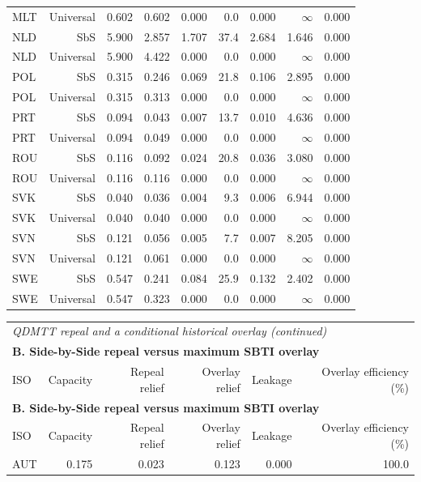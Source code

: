 {\begin{longtable}{@{}lrrrrrrrr@{}}
MLT & Universal & 0.602 & 0.602 & 0.000 &  0.0 & 0.000 & $\infty$ & 0.000 \\
NLD & SbS & 5.900 & 2.857 & 1.707 & 37.4 & 2.684 & 1.646 & 0.000 \\
NLD & Universal & 5.900 & 4.422 & 0.000 &  0.0 & 0.000 & $\infty$ & 0.000 \\
POL & SbS & 0.315 & 0.246 & 0.069 & 21.8 & 0.106 & 2.895 & 0.000 \\
POL & Universal & 0.315 & 0.313 & 0.000 &  0.0 & 0.000 & $\infty$ & 0.000 \\
PRT & SbS & 0.094 & 0.043 & 0.007 & 13.7 & 0.010 & 4.636 & 0.000 \\
PRT & Universal & 0.094 & 0.049 & 0.000 &  0.0 & 0.000 & $\infty$ & 0.000 \\
ROU & SbS & 0.116 & 0.092 & 0.024 & 20.8 & 0.036 & 3.080 & 0.000 \\
ROU & Universal & 0.116 & 0.116 & 0.000 &  0.0 & 0.000 & $\infty$ & 0.000 \\
SVK & SbS & 0.040 & 0.036 & 0.004 &  9.3 & 0.006 & 6.944 & 0.000 \\
SVK & Universal & 0.040 & 0.040 & 0.000 &  0.0 & 0.000 & $\infty$ & 0.000 \\
SVN & SbS & 0.121 & 0.056 & 0.005 &  7.7 & 0.007 & 8.205 & 0.000 \\
SVN & Universal & 0.121 & 0.061 & 0.000 &  0.0 & 0.000 & $\infty$ & 0.000 \\
SWE & SbS & 0.547 & 0.241 & 0.084 & 25.9 & 0.132 & 2.402 & 0.000 \\
SWE & Universal & 0.547 & 0.323 & 0.000 &  0.0 & 0.000 & $\infty$ & 0.000 \\
\end{longtable}
\addtocounter{table}{-1}
\begin{longtable}{@{}lrrrrr@{}}
\multicolumn{6}{l}{\textit{QDMTT repeal and a conditional historical overlay (continued)}} \\
\multicolumn{6}{l}{\textbf{B. Side-by-Side repeal versus maximum SBTI overlay}} \\
\toprule
ISO & Capacity & Repeal relief & Overlay relief & Leakage & Overlay efficiency (\%) \\
\midrule
\endfirsthead
\multicolumn{6}{l}{\textbf{B. Side-by-Side repeal versus maximum SBTI overlay}} \\
\toprule
ISO & Capacity & Repeal relief & Overlay relief & Leakage & Overlay efficiency (\%) \\
\midrule
\endhead
\midrule
\endfoot
\bottomrule
\endlastfoot
AUT & 0.175 & 0.023 & 0.123 & 0.000 & 100.0 \\

\end{longtable}}
